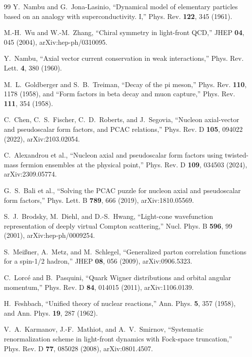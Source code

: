 \documentclass[11pt]{article}
\begin{document}
\begin{thebibliography}{99}
Y.~Nambu and G.~Jona-Lasinio,
``Dynamical model of elementary particles based on an analogy with
superconductivity. I,''
Phys. Rev. \textbf{122}, 345 (1961).

M.-H.~Wu and W.-M.~Zhang,
``Chiral symmetry in light-front QCD,''
JHEP \textbf{04}, 045 (2004),
arXiv:hep-ph/0310095.

Y.~Nambu,
``Axial vector current conservation in weak interactions,''
Phys. Rev. Lett. \textbf{4}, 380 (1960).

M.~L.~Goldberger and S.~B.~Treiman,
``Decay of the pi meson,''
Phys. Rev. \textbf{110}, 1178 (1958),
and
``Form factors in beta decay and muon capture,''
Phys. Rev. \textbf{111}, 354 (1958).

C.~Chen, C.~S.~Fischer, C.~D.~Roberts, and J.~Segovia,
``Nucleon axial-vector and pseudoscalar form factors, and PCAC relations,''
Phys. Rev. D \textbf{105}, 094022 (2022),
arXiv:2103.02054.

C.~Alexandrou et al.,
``Nucleon axial and pseudoscalar form factors using twisted-mass fermion
ensembles at the physical point,''
Phys. Rev. D \textbf{109}, 034503 (2024),
arXiv:2309.05774.

G.~S.~Bali et al.,
``Solving the PCAC puzzle for nucleon axial and pseudoscalar form factors,''
Phys. Lett. B \textbf{789}, 666 (2019),
arXiv:1810.05569.

S.~J.~Brodsky, M.~Diehl, and D.-S.~Hwang,
``Light-cone wavefunction representation of deeply virtual Compton
scattering,''
Nucl. Phys. B \textbf{596}, 99 (2001),
arXiv:hep-ph/0009254.

S.~Mei{\ss}ner, A.~Metz, and M.~Schlegel,
``Generalized parton correlation functions for a spin-1/2 hadron,''
JHEP \textbf{08}, 056 (2009),
arXiv:0906.5323.

C.~Lorc\'e and B.~Pasquini,
``Quark Wigner distributions and orbital angular momentum,''
Phys. Rev. D \textbf{84}, 014015 (2011),
arXiv:1106.0139.

H.~Feshbach,
``Unified theory of nuclear reactions,''
Ann. Phys. \textbf{5}, 357 (1958),
and Ann. Phys. \textbf{19}, 287 (1962).

V.~A.~Karmanov, J.-F.~Mathiot, and A.~V.~Smirnov,
``Systematic renormalization scheme in light-front dynamics with Fock-space
truncation,''
Phys. Rev. D \textbf{77}, 085028 (2008),
arXiv:0801.4507.


\end{thebibliography}
\end{document}
